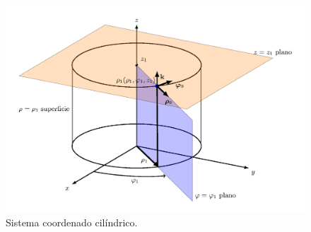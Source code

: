 \begin{figure}[H]
    \centering
    \includegraphics[scale=0.25]{Imagenes/Sistema_Cilindrico_01.png}
    \caption{Sistema coordenado cilíndrico.}
    \label{fig:figura_sistema_01_cilindrico}
\end{figure}
